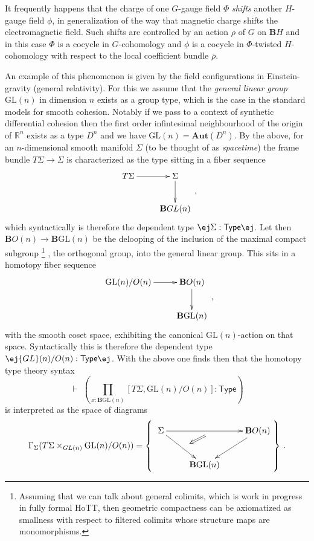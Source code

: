 \documentclass[copyright]{eptcs}
\makeatletter
\newcommand{\type}{\ensuremath{\mathsf{Type}}\xspace}
\def\jd#1{\@jd#1\ej}
\def\@jd#1|-#2\ej{\@@jd#1,,\;\vdash\;\left(#2\right)}
\def\@@jd#1,{\@ifmtarg{#1}{\let\next=\relax}{\left(#1\right)\let\next=\@@@jd}\next}
\def\@@@jd#1,{\@ifmtarg{#1}{\let\next=\relax}{,\,\left(#1\right)\let\next=\@@@jd}\next}
\makeatother
\begin{document}
It frequently happens that the charge of one $G$-gauge field $\Phi$ \emph{shifts} another $H$-gauge field
$\phi$, in generalization of the way that magnetic charge shifts the electromagnetic field.
Such shifts are controlled by an action $\rho$ of $G$ on $\mathbf{B}H$ and in this case
$\Phi$ is a cocycle in $G$-cohomology and $\phi$ is a cocycle in $\Phi$-twisted $H$-cohomology
with respect to the local coefficient bundle $\bar \rho$.

An example of this phenomenon is given by the field configurations in Einstein-gravity
(general relativity). For this we assume that the \emph{general linear group} $\mathrm{GL}(n)$
in dimension $n$ exists as a group type, which is the case in the standard models for
smooth cohesion. Notably if we pass to a context of synthetic differential cohesion then
the first order infintesimal neighbourhood of the origin of $\mathbb{R}^n$ exists as a
type $D^n$ and we have $\mathrm{GL}(n) = \mathbf{Aut}(D^n)$. By the above, for an $n$-dimensional
smooth manifold $\Sigma$ (to be thought of as \emph{spacetime}) the frame bundle
$T \Sigma \to \Sigma$
is characterized as the type sitting
in a fiber sequence
$$
  \raisebox{20pt}{
  \xymatrix{
    T \Sigma \ar[r] & \Sigma \ar[d]
  \\
  & \mathbf{B}GL(n)
  }}
  \,,
$$
which syntactically is therefore the dependent type $\jd{x : \mathbf{B}GL(n) |- T \Sigma : \type}$.
Let then $\mathbf{B}O(n) \to \mathbf{B}\mathrm{GL}(n)$ be the delooping of the inclusion of the
maximal compact subgroup
\footnote{Assuming that we can talk about general colimits, which is
work in progress in fully formal HoTT, then geometric compactness can be axiomatized
as smallness with respect to filtered colimits whose structure maps are monomorphisms.}
, the
orthogonal group, into the general linear group. This sits in a homotopy fiber sequence
$$
  \raisebox{20pt}{
  \xymatrix{
    \mathrm{GL}(n)/O(n) \ar[r] & \mathbf{B}O(n) \ar[d]
  \\
  & \mathbf{B}\mathrm{GL}(n)
  }
  }
  \,,
$$
with the smooth coset space, exhibiting the canonical $\mathrm{GL}(n)$-action on that space.
Syntactically this is therefore the dependent type
$\jd{x : \mathbf{B}\mathrm{GL}(n) |- \mathrm{GL}(n)/O(n) : \type}$.
With the above one finds then that the homotopy type theory syntax
$$
  \vdash\; \left(\prod_{x : \mathbf{B}\mathrm{GL}(n)} [T \Sigma, \mathrm{GL}(n)/O(n)] : \type\right)
$$
is interpreted as the space of diagrams
$$
  \Gamma_{\Sigma}(T \Sigma \times_{GL(n)} \mathrm{GL}(n)/O(n))
  =
  \left\{
   \raisebox{20pt}{
  \xymatrix{
    \Sigma \ar[rr]_{\ }="s" \ar[dr]^{\ }="t" && \mathbf{B}O(n) \ar[dl]
  \\
  & \mathbf{B}\mathrm{GL}(n)
  \ar@{=>} "s"; "t"
  }}
  \right\}
  \,.
$$
\end{document}
